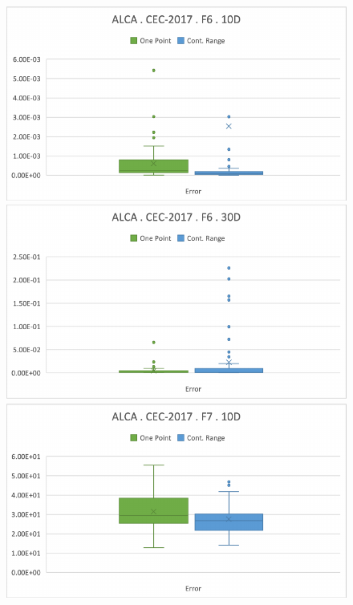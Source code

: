 \documentclass[graybox]{svmult}
\begin{document}
    \begin{figure}[!ht]
        \begin{minipage}[h]{0.49\linewidth}
            \includegraphics[width=1\linewidth]{img/fig_experiment_F6x10D.pdf} 
        \end{minipage}
        \hfill
        \begin{minipage}[h]{0.49\linewidth}
            \includegraphics[width=1\linewidth]{img/fig_experiment_F6x30D.pdf} 
        \end{minipage} 
        \vfill
        \vspace{0.05 cm}
        \begin{minipage}[h]{0.49\linewidth}
            \includegraphics[width=1\linewidth]{img/fig_experiment_F7x10D.pdf} 

\end{minipage}
\end{figure}
\end{document}
